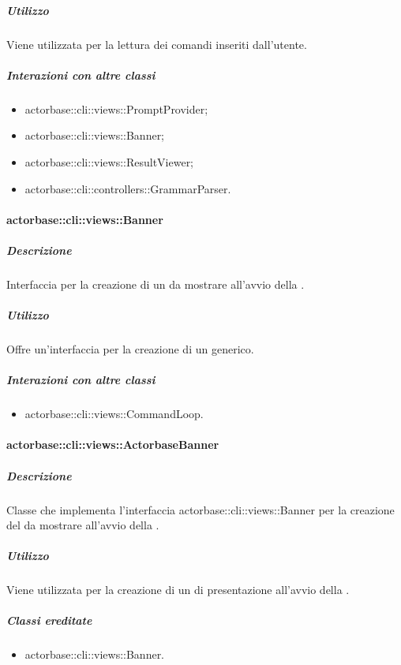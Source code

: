 \documentclass{scalatekids-article}
\begin{document}
\subparagraph{Utilizzo}

Viene utilizzata per la lettura dei comandi inseriti dall'utente.

\subparagraph{Interazioni con altre classi}

\begin{itemize}
\item actorbase::cli::views::PromptProvider;
\item actorbase::cli::views::Banner;
\item actorbase::cli::views::ResultViewer;
\item actorbase::cli::controllers::GrammarParser.
\end{itemize}

\paragraph{actorbase::cli::views::Banner}

\subparagraph{Descrizione}

Interfaccia per la creazione di un  da mostrare all'avvio della .

\subparagraph{Utilizzo}

Offre un'interfaccia per la creazione di un  generico.

\subparagraph{Interazioni con altre classi}

\begin{itemize}
\item actorbase::cli::views::CommandLoop.
\end{itemize}

\paragraph{actorbase::cli::views::ActorbaseBanner}

\subparagraph{Descrizione}

Classe che implementa l'interfaccia actorbase::cli::views::Banner per la creazione del  da mostrare all'avvio della .

\subparagraph{Utilizzo}

Viene utilizzata per la creazione di un  di presentazione all'avvio della .

\subparagraph{Classi ereditate}

\begin{itemize}
\item actorbase::cli::views::Banner.
\end{itemize}
\end{document}
